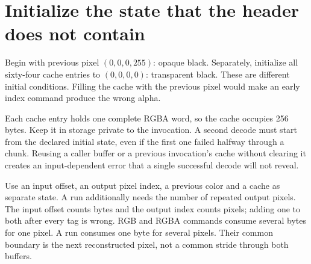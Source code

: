 \section{Initialize the state that the header does not contain}
Begin with previous pixel \((0,0,0,255)\): opaque black. Separately, initialize all
sixty-four cache entries to \((0,0,0,0)\): transparent black. These are different
initial conditions. Filling the cache with the previous pixel would make an early
index command produce the wrong alpha.

Each cache entry holds one complete RGBA word, so the cache occupies 256 bytes. Keep
it in storage private to the invocation. A second decode must start from the declared
initial state, even if the first one failed halfway through a chunk. Reusing a caller
buffer or a previous invocation's cache without clearing it creates an input-dependent
error that a single successful decode will not reveal.

Use an input offset, an output pixel index, a previous color and a cache as separate
state. A run additionally needs the number of repeated output pixels. The input offset
counts bytes and the output index counts pixels; adding one to both after every tag
is wrong. RGB and RGBA commands consume several bytes for one pixel. A run consumes
one byte for several pixels. Their common boundary is the next reconstructed pixel,
not a common stride through both buffers.
